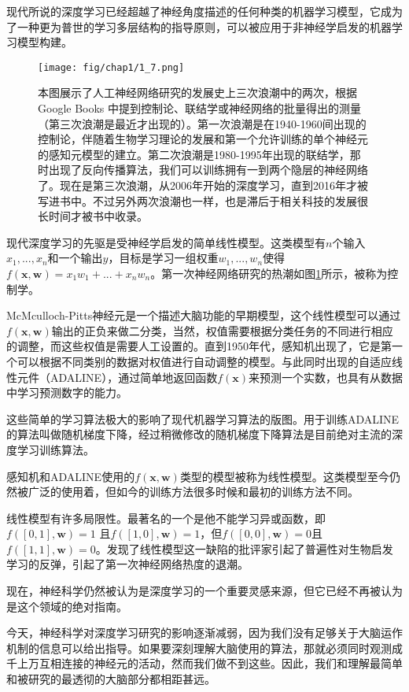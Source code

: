 现代所说的深度学习已经超越了神经角度描述的任何种类的机器学习模型，它成为了一种更为普世的学习多层结构的指导原则，可以被应用于非神经学启发的机器学习模型构建。

\begin{figure}[htbp] %
   \centering
   \texttt{[image: fig/chap1/1\_7.png]} 
   \caption{本图展示了人工神经网络研究的发展史上三次浪潮中的两次，根据Google Books 中提到控制论、联结学或神经网络的批量得出的测量（第三次浪潮是最近才出现的）。第一次浪潮是在1940-1960间出现的控制论，伴随着生物学习理论的发展和第一个允许训练的单个神经元的感知元模型的建立。第二次浪潮是1980-1995年出现的联结学，那时出现了反向传播算法，我们可以训练拥有一到两个隐层的神经网络了。现在是第三次浪潮，从2006年开始的深度学习，直到2016年才被写进书中。不过另外两次浪潮也一样，也是滞后于相关科技的发展很长时间才被书中收录。}
   \label{fig:1.7}
\end{figure}


现代深度学习的先驱是受神经学启发的简单线性模型。这类模型有$n$个输入$x_1,...,x_n$和一个输出$y$，目标是学习一组权重$w_1,...,w_n$使得$f(\textbf{x},\textbf{w}) =x_1w_1+...+x_nw_n$。第一次神经网络研究的热潮如图\ref{fig:1.7}所示，被称为控制学。

McMculloch-Pitts神经元是一个描述大脑功能的早期模型，这个线性模型可以通过$f(\textbf{x},\textbf{w})$输出的正负来做二分类，当然，权值需要根据分类任务的不同进行相应的调整，而这些权值是需要人工设置的。直到1950年代，感知机出现了，它是第一个可以根据不同类别的数据对权值进行自动调整的模型。与此同时出现的自适应线性元件（ADALINE），通过简单地返回函数$f(\textbf{x})$来预测一个实数，也具有从数据中学习预测数字的能力。

这些简单的学习算法极大的影响了现代机器学习算法的版图。用于训练ADALINE的算法叫做随机梯度下降，经过稍微修改的随机梯度下降算法是目前绝对主流的深度学习训练算法。


感知机和ADALINE使用的$f(\textbf{x},\textbf{w})$类型的模型被称为线性模型。这类模型至今仍然被广泛的使用着，但如今的训练方法很多时候和最初的训练方法不同。


线性模型有许多局限性。最著名的一个是他不能学习异或函数，即$f([0,1],\textbf{w}) =1$ 且$f([1,0],\textbf{w}) =1$，但$f([0,0],\textbf{w}) =0$且$f([1,1],\textbf{w}) =0$。发现了线性模型这一缺陷的批评家引起了普遍性对生物启发学习的反弹，引起了第一次神经网络热度的退潮。


现在，神经科学仍然被认为是深度学习的一个重要灵感来源，但它已经不再被认为是这个领域的绝对指南。


今天，神经科学对深度学习研究的影响逐渐减弱，因为我们没有足够关于大脑运作机制的信息可以给出指导。如果要深刻理解大脑使用的算法，那就必须同时观测成千上万互相连接的神经元的活动，然而我们做不到这些。因此，我们和理解最简单和被研究的最透彻的大脑部分都相距甚远。


